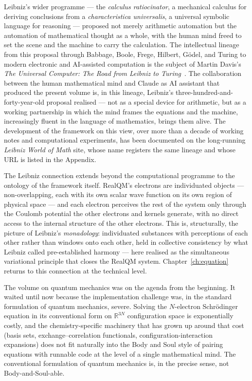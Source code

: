 Leibniz's wider programme --- the \emph{calculus ratiocinator}, a mechanical calculus for deriving conclusions from a \emph{characteristica universalis}, a universal symbolic language for reasoning --- proposed not merely arithmetic automation but the automation of mathematical thought as a whole, with the human mind freed to set the scene and the machine to carry the calculation. The intellectual lineage from this proposal through Babbage, Boole, Frege, Hilbert, G\"odel, and Turing to modern electronic and AI-assisted computation is the subject of Martin Davis's \emph{The Universal Computer: The Road from Leibniz to Turing}~\cite{Davis2000}. The collaboration between the human mathematical mind and Claude as AI assistant that produced the present volume is, in this lineage, Leibniz's three-hundred-and-forty-year-old proposal realised --- not as a special device for arithmetic, but as a working partnership in which the mind frames the equations and the machine, increasingly fluent in the language of mathematics, brings them alive. The development of the framework on this view, over more than a decade of working notes and computational experiments, has been documented on the long-running \emph{Leibniz World of Math} site, whose name registers the same lineage and whose URL is listed in the Appendix.

The Leibniz connection extends beyond the computational programme to the ontology of the framework itself. RealQM's electrons are individuated objects --- non-overlapping, each with its own scalar wave function on its own region of physical space --- and each electron perceives the rest of the system only through the Coulomb potential the other electrons and kernels generate, with no direct access to the internal structure of the other electrons. This is, structurally, the picture of Leibniz's \emph{monadology}: individuated substances with perceptions of each other rather than windows onto each other, held in collective consistency by what Leibniz called pre-established harmony --- here realised as the simultaneous variational principle that closes the RealQM system. Chapter~\ref{ch:equation} returns to this connection at the technical level.

The volume on quantum mechanics was on the agenda from the beginning. It waited until now because the implementation challenge was, in the standard formulation of quantum mechanics, severe. Solving the $N$-electron Schr\"odinger equation in its conventional form on $\mathbb{R}^{3N}$ configuration space is exponentially costly, and the chemistry-specific machinery that has grown up around that cost (basis sets, exchange--correlation functionals, configuration-interaction expansions) does not fit naturally into the Body and Soul style of pairing equations with runnable code at the level of a single mathematical mind. The conventional formulation of quantum mechanics is, in the precise sense, not Body-and-Soul-able.

